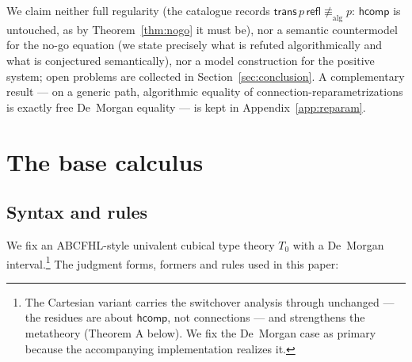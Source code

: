 \documentclass{lmcs}
\newcommand{\hcomp}{\mathsf{hcomp}}
\newcommand{\refl}{\mathsf{refl}}
\newcommand{\aconv}{\equiv_{\mathrm{alg}}}
\begin{document}
We claim neither full regularity (the catalogue records
$\mathsf{trans}\,p\,\refl \not\aconv p$: $\hcomp$ is untouched, as by
Theorem~\ref{thm:nogo} it must be), nor a semantic countermodel for
the no-go equation (we state precisely what is refuted
algorithmically and what is conjectured semantically), nor a model
construction for the positive system; open problems are collected in
Section~\ref{sec:conclusion}.  A complementary result --- on a
generic path, algorithmic equality of connection-reparametrizations
is exactly free De~Morgan equality --- is kept in
Appendix~\ref{app:reparam}.

\section{The base calculus}
\label{sec:base}

\subsection{Syntax and rules}
\label{sec:rules}

We fix an ABCFHL-style univalent cubical type theory $T_0$ with a
De~Morgan interval.\footnote{The Cartesian variant carries the
switchover analysis through unchanged --- the residues are about
$\hcomp$, not connections --- and strengthens the metatheory
(Theorem A below).  We fix the De~Morgan case as primary because the
accompanying implementation realizes it.}  The judgment forms,
formers and rules used in this paper:
\end{document}
